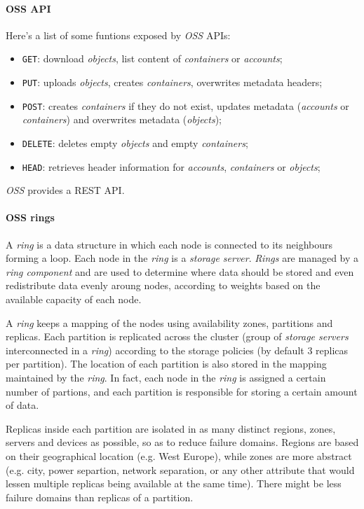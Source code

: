 \paragraph{OSS API}
Here's a list of some funtions exposed by \emph{OSS} APIs:
\begin{itemize}
    \item \texttt{GET}: download \emph{objects}, list content of \emph{containers} or
    \emph{accounts};
    \item \texttt{PUT}: uploads \emph{objects}, creates \emph{containers},
    overwrites metadata headers;
    \item \texttt{POST}: creates \emph{containers} if they do not exist, updates
    metadata (\emph{accounts} or \emph{containers}) and overwrites metadata
    (\emph{objects});
    \item \texttt{DELETE}: deletes empty \emph{objects} and empty \emph{containers};
    \item \texttt{HEAD}: retrieves header information for \emph{accounts}, \emph{containers}
    or \emph{objects};
\end{itemize}

\begin{note}
    \emph{OSS} provides a REST API.
\end{note}

\paragraph{OSS rings}
A \emph{ring} is a data structure in which each node is connected to its
neighbours forming a loop. Each node in the \emph{ring} is a \emph{storage server}.
\emph{Rings} are managed by a \emph{ring component} and are used to determine
where data should be stored and even redistribute data evenly aroung nodes,
according to weights based on the available capacity of each node.

A \emph{ring} keeps a mapping of the nodes using availability zones, partitions
and replicas. Each partition is replicated across the cluster (group of
\emph{storage servers} interconnected in a \emph{ring}) according to the
storage policies (by default 3 replicas per partition). The location of each
partition is also stored in the mapping maintained by the \emph{ring}. In fact,
each node in the \emph{ring} is assigned a certain number of partions, and each
partition is responsible for storing a certain amount of data.

Replicas inside each partition are isolated in as many distinct regions, zones,
servers and devices as possible, so as to reduce failure domains. Regions are
based on their geographical location (e.g. West Europe), while zones are more
abstract (e.g. city, power separtion, network separation, or any other attribute
that would lessen multiple replicas being available at the same time). There
might be less failure domains than replicas of a partition.

